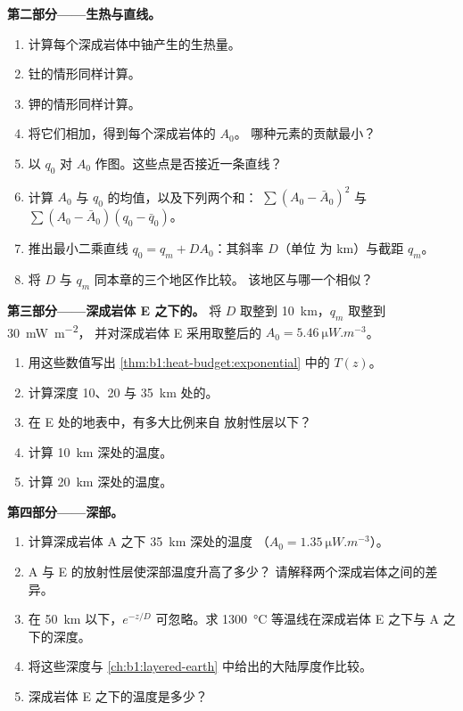 \begin{problem}
\noindent\textbf{第二部分——生热与直线。}
\begin{enumerate}[resume]
  \item 计算每个深成岩体中铀产生的生热量。
  \item 钍的情形同样计算。
  \item 钾的情形同样计算。
  \item 将它们相加，得到每个深成岩体的 $A_0$。
        哪种元素的贡献最小？
  \item 以 $q_0$ 对 $A_0$ 作图。这些点是否接近一条直线？
  \item 计算 $A_0$ 与 $q_0$ 的均值，以及下列两个和：
        $\sum (A_0 - \bar A_0)^2$ 与 $\sum (A_0 - \bar A_0)(q_0 - \bar q_0)$。
  \item 推出最小二乘直线 $q_0 = q_m + D A_0$：其斜率 $D$（单位
        为 \unit{km}）与截距 $q_m$。
  \item 将 $D$ 与 $q_m$ 同本章的三个地区作比较。
        该地区与哪一个相似？
\end{enumerate}

\noindent\textbf{第三部分——深成岩体 E 之下的。}
将 $D$ 取整到 \qty{10}{km}，$q_m$ 取整到 \qty{30}{mW.m^{-2}}，
并对深成岩体 E 采用取整后的 $A_0 = \qty{5.46}{\micro W.m^{-3}}$。
\begin{enumerate}[resume]
  \item 用这些数值写出 \cref{thm:b1:heat-budget:exponential} 中的
         $T(z)$。
  \item 计算深度 10、20 与 \qty{35}{km} 处的。
  \item 在 E 处的地表中，有多大比例来自
        放射性层以下？
  \item 计算 \qty{10}{km} 深处的温度。
  \item 计算 \qty{20}{km} 深处的温度。
\end{enumerate}

\noindent\textbf{第四部分——深部。}
\begin{enumerate}[resume]
  \item 计算深成岩体 A 之下 \qty{35}{km} 深处的温度
        （$A_0 = \qty{1.35}{\micro W.m^{-3}}$）。
  \item A 与 E 的放射性层使深部温度升高了多少？
        请解释两个深成岩体之间的差异。
  \item 在 \qty{50}{km} 以下，$e^{-z/D}$ 可忽略。求
        \qty{1300}{\degreeCelsius} 等温线在深成岩体 E 之下与 A 之下的深度。
  \item 将这些深度与
        \cref{ch:b1:layered-earth} 中给出的大陆厚度作比较。
  \item 深成岩体 E 之下的温度是多少？
\end{enumerate}
\end{problem}
